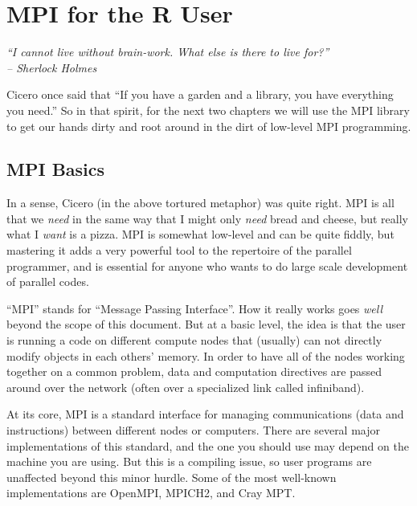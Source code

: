 


\chapter{MPI for the R User}
\label{chp:mpi_for_the_r_user}


{\it
``I cannot live without brain-work. What else is there to live for?'' \\
\--- Sherlock Holmes
}
\vspace{0.5cm}


Cicero once said that ``If you have a garden and a library, you have
everything you need.'' So in that spirit, for the next two chapters we will
use the MPI library to get our hands dirty and root around in the dirt of
low-level MPI programming.

\section{MPI Basics}

In a sense, Cicero (in the above tortured metaphor) was quite right. MPI is
all that we \emph{need} in the same way that I might only \emph{need} bread
and cheese, but really what I \emph{want} is a pizza. MPI is somewhat
low-level and can be quite fiddly, but mastering it adds a very powerful
tool to the repertoire of the parallel  programmer, and is
essential for anyone who wants to do large scale development of parallel
codes.  

``MPI'' stands for ``Message Passing Interface''. How it really works goes \emph{well} beyond the scope of 
this document. But at a basic level, the idea is that the user is running a 
code on different compute nodes that (usually) can not directly modify objects 
in each others' memory.  In order to have all of the nodes working together on 
a common problem, data and computation directives are passed around over the 
network (often over a specialized link called infiniband).  

At its core, MPI is a standard interface for managing communications
(data and instructions) between different nodes or computers.
There are several major implementations of this standard, and the one
you should use may depend on the machine you are using.
But this is a compiling issue, so user programs are unaffected beyond
this minor hurdle. Some of the most well-known implementations are
OpenMPI, MPICH2, and
Cray MPT.

